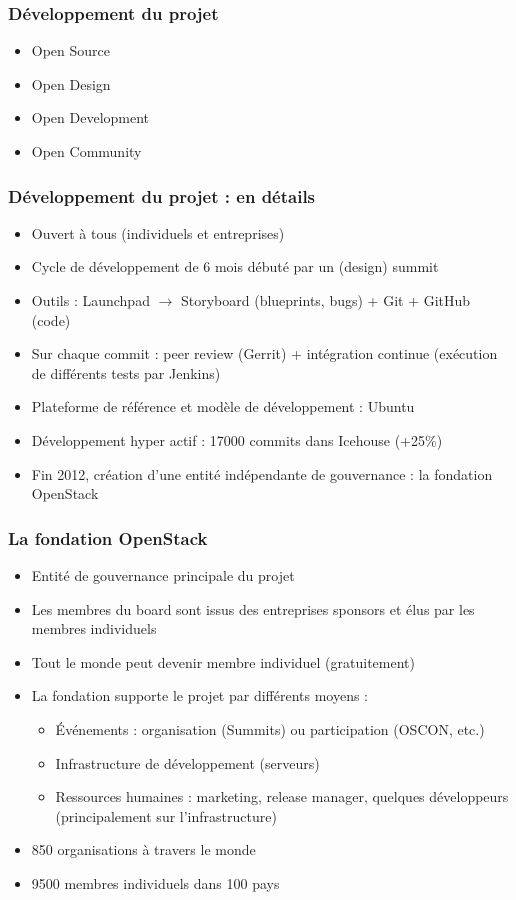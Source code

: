   \begin{frame}
    \frametitle{Développement du projet}
    \begin{itemize}
      \item Open Source
      \item Open Design
      \item Open Development
      \item Open Community
    \end{itemize}
  \end{frame}

  \begin{frame}
    \frametitle{Développement du projet : en détails}
    \begin{itemize}
      \item Ouvert à tous (individuels et entreprises)\pause
      \item Cycle de développement de 6 mois débuté par un (design) summit\pause
      \item Outils : Launchpad $\rightarrow$ Storyboard (blueprints, bugs) + Git + GitHub (code)\pause
      \item Sur chaque commit : peer review (Gerrit) + intégration continue (exécution de différents tests par Jenkins)\pause
      \item Plateforme de référence et modèle de développement : Ubuntu\pause
      \item Développement hyper actif : 17000 commits dans Icehouse (+25\%)\pause
      \item Fin 2012, création d'une entité indépendante de gouvernance : la fondation OpenStack
    \end{itemize}
  \end{frame}

  \begin{frame}
    \frametitle{La fondation OpenStack}
    \begin{itemize}
      \item Entité de gouvernance principale du projet
      \item Les membres du board sont issus des entreprises sponsors et élus par les membres individuels
      \item Tout le monde peut devenir membre individuel (gratuitement)
      \item La fondation supporte le projet par différents moyens :
      \begin{itemize}
        \item Événements : organisation (Summits) ou participation (OSCON, etc.)
        \item Infrastructure de développement (serveurs)
        \item Ressources humaines : marketing, release manager, quelques développeurs (principalement sur l'infrastructure)
      \end{itemize}
      \item 850 organisations à travers le monde
      \item 9500 membres individuels dans 100 pays
    \end{itemize}
  \end{frame}

